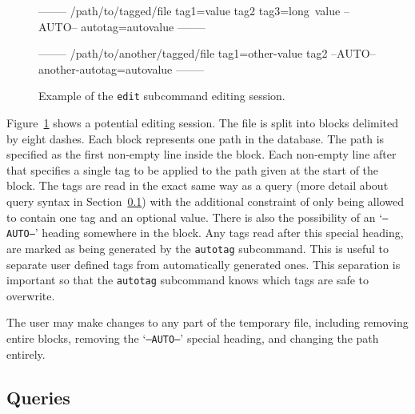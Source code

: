 \begin{figure}[h]
    \centering
    \begin{boxedverbatim}


--------
/path/to/tagged/file
tag1=value
tag2
tag3=long\ value
--AUTO--
autotag=autovalue
--------

--------
/path/to/another/tagged/file
tag1=other-value
tag2
--AUTO--
another-autotag=autovalue
--------
    \end{boxedverbatim}
    \label{fig:edit-subcommand-format}
    \caption{Example of the \texttt{edit} subcommand editing session.}
\end{figure}

Figure~\ref{fig:edit-subcommand-format} shows a potential editing session. The
file is split into blocks delimited by eight dashes. Each block represents one
path in the database. The path is specified as the first non-empty line inside
the block. Each non-empty line after that specifies a single tag to be applied
to the path given at the start of the block. The tags are read in the exact
same way as a query (more detail about query syntax in
Section~\ref{sec:queries}) with the additional constraint of only being
allowed to contain one tag and an optional value. There is also the possibility
of an `\texttt{--AUTO--}' heading somewhere in the block. Any tags read after
this special heading, are marked as being generated by the \texttt{autotag}
subcommand. This is useful to separate user defined tags from automatically
generated ones. This separation is important so that the \texttt{autotag}
subcommand knows which tags are safe to overwrite. 

The user may make changes to any part of the temporary file, including removing
entire blocks, removing the `\texttt{--AUTO--}' special heading, and changing
the path entirely.


\subsection{Queries}
\label{sec:queries}

